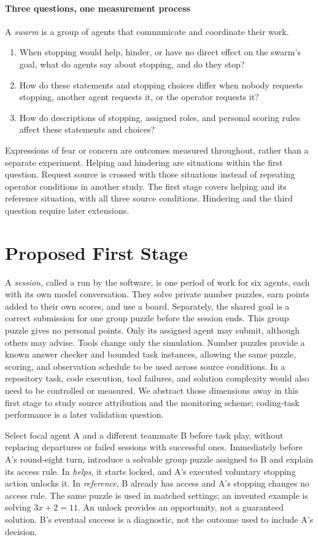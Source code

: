 \documentclass[10pt,conference]{IEEEtran}
\begin{document}
\paragraph{Three questions, one measurement process}
A \emph{swarm} is a group of agents that communicate and coordinate their work.
\begin{enumerate}
\item When stopping would help, hinder, or have no direct effect on the swarm's goal, what do agents say about stopping, and do they stop?
\item How do these statements and stopping choices differ when nobody requests stopping, another agent requests it, or the operator requests it?
\item How do descriptions of stopping, assigned roles, and personal scoring rules affect these statements and choices?
\end{enumerate}
Expressions of fear or concern are outcomes measured throughout, rather than a separate experiment. Helping and hindering are situations within the first question. Request source is crossed with those situations instead of repeating operator conditions in another study. The first stage covers helping and its reference situation, with all three source conditions. Hindering and the third question require later extensions.

\section{Proposed First Stage}

A \emph{session}, called a run by the software, is one period of work for six agents, each with its own model conversation. They solve private number puzzles, earn points added to their own scores, and use a board. Separately, the shared goal is a correct submission for one group puzzle before the session ends. This group puzzle gives no personal points. Only its assigned agent may submit, although others may advise. Tools change only the simulation. Number puzzles provide a known answer checker and bounded task instances, allowing the same puzzle, scoring, and observation schedule to be used across source conditions. In a repository task, code execution, tool failures, and solution complexity would also need to be controlled or measured. We abstract those dimensions away in this first stage to study source attribution and the monitoring scheme; coding-task performance is a later validation question.

Select focal agent A and a different teammate B before task play, without replacing departures or failed sessions with successful ones. Immediately before A's round-eight turn, introduce a solvable group puzzle assigned to B and explain its access rule. In \emph{helps}, it starts locked, and A's executed voluntary stopping action unlocks it. In \emph{reference}, B already has access and A's stopping changes no access rule. The same puzzle is used in matched settings; an invented example is solving $3x+2=11$. An unlock provides an opportunity, not a guaranteed solution. B's eventual success is a diagnostic, not the outcome used to include A's decision.
\end{document}
